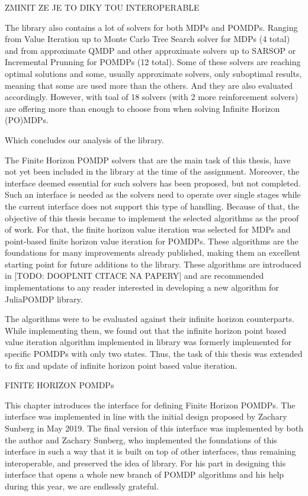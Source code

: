 ZMINIT ZE JE TO DIKY TOU INTEROPERABLE

The library also contains a lot of solvers for both MDPs and POMDPs. Ranging from Value Iteration up to Monte Carlo Tree Search solver for MDPs (4 total) and from approximate QMDP and other approximate solvers up to SARSOP or Incremental Prunning for POMDPs (12 total). Some of these solvers are reaching optimal solutions and some, usually approximate solvers, only suboptimal results, meaning that some are used more than the others. And they are also evaluated accordingly. However, with toal of 18 solvers (with 2 more reinforcement solvers) are offering more than enough to choose from when solving Infinite Horizon (PO)MDPs. 

Which concludes our analysis of the library.

The Finite Horizon POMDP solvers that are the main task of this thesis, have not yet been included in the library at the time of the assignment. Moreover, the interface deemed essential for such solvers has been proposed, but not completed. Such an interface is needed as the solvers need to operate over single stages while the current interface does not support this type of handling. Because of that, the objective of this thesis became to implement the selected algorithms as the proof of work. For that, the finite horizon value iteration was selected for MDPs and point-based finite horizon value iteration for POMDPs. These algorithms are the foundations for many improvements already published, making them an excellent starting point for future additions to the library. These algorithms are introduced in [TODO: DOOPLNIT CITACE NA PAPERY] and are recommended implementations to any reader interested in developing a new algorithm for JuliaPOMDP library. 

The algorithms were to be evaluated against their infinite horizon counterparts. While implementing them, we found out that the infinite horizon point based value iteration algorithm implemented in library was formerly implemented for specific POMDPs with only two states. Thus, the task of this thesis was extended to fix and update of infinite horizon point based value iteration.




FINITE HORIZON POMDPs

This chapter introduces the interface for defining Finite Horizon POMDPs. The interface was implemented in line with the initial design proposed by Zachary Sunberg in May 2019. The final version of this interface was implemented by both the author and Zachary Sunberg, who implemented the foundations of this interface in such a way that it is built on top of other interfaces, thus remaining interoperable, and preserved the idea of library. For his part in designing this interface that opens a whole new branch of POMDP algorithms and his help during this year, we are endlessly grateful.




